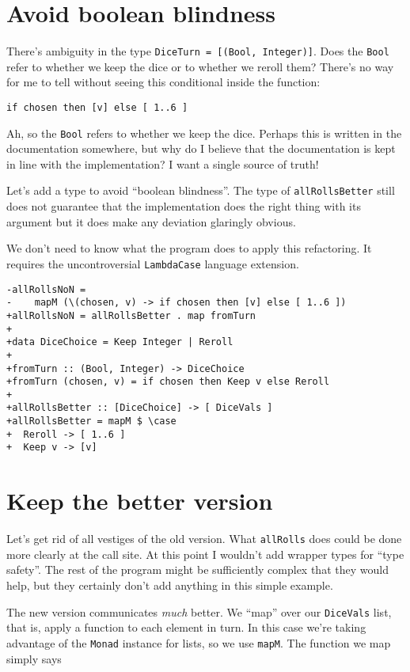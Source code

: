 \section{Avoid boolean blindness}


There's ambiguity in the type \texttt{DiceTurn = [(Bool, Integer)]}. Does the \texttt{Bool} refer to whether we keep the dice or to whether we reroll them? There's no way for me to tell without seeing this conditional inside the function:

\begin{verbatim}
if chosen then [v] else [ 1..6 ]
\end{verbatim}
Ah, so the \texttt{Bool} refers to whether we keep the dice. Perhaps this is written in the documentation somewhere, but why do I believe that the documentation is kept in line with the implementation? I want a single source of truth!

Let's add a type to avoid ``boolean blindness''. The type of \texttt{allRollsBetter} still does not guarantee that the implementation does the right thing with its argument but it does make any deviation glaringly obvious.

We don't need to know what the program does to apply this refactoring. It requires the uncontroversial \texttt{LambdaCase} language extension.

\begin{verbatim}
-allRollsNoN =
-    mapM (\(chosen, v) -> if chosen then [v] else [ 1..6 ])
+allRollsNoN = allRollsBetter . map fromTurn
+
+data DiceChoice = Keep Integer | Reroll
+
+fromTurn :: (Bool, Integer) -> DiceChoice
+fromTurn (chosen, v) = if chosen then Keep v else Reroll
+
+allRollsBetter :: [DiceChoice] -> [ DiceVals ]
+allRollsBetter = mapM $ \case
+  Reroll -> [ 1..6 ]
+  Keep v -> [v]
\end{verbatim}


\section{Keep the better version}


Let's get rid of all vestiges of the old version. What \texttt{allRolls} does could be done more clearly at the call site. At this point I wouldn't add wrapper types for ``type safety''. The rest of the program might be sufficiently complex that they would help, but they certainly don't add anything in this simple example.

The new version communicates \textit{much} better. We ``map'' over our \texttt{DiceVals} list, that is, apply a function to each element in turn. In this case we're taking advantage of the \texttt{Monad} instance for lists, so we use \texttt{mapM}. The function we map simply says

